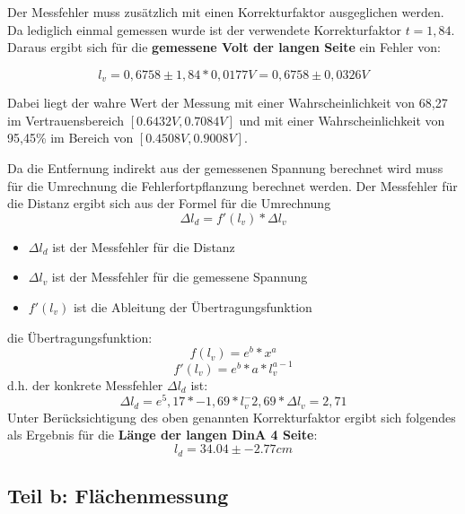 Der Messfehler muss zusätzlich mit einen Korrekturfaktor ausgeglichen werden.
Da lediglich einmal gemessen wurde ist der verwendete Korrekturfaktor $t = 1,84$.
Daraus ergibt sich für die \textbf{gemessene Volt der langen Seite} ein Fehler von:

\begin{equation}
	l_v = 0,6758 \pm 1,84 * 0,0177 V = 0,6758 \pm 0,0326 V
\end{equation}

Dabei liegt der wahre Wert der Messung mit einer Wahrscheinlichkeit von 68,27 im Vertrauensbereich $[0.6432V, 0.7084V]$ und mit einer Wahrscheinlichkeit von 95,45\% im Bereich von $[0.4508V, 0.9008V]$.

Da die Entfernung indirekt aus der gemessenen Spannung berechnet wird muss für die Umrechnung die Fehlerfortpflanzung berechnet werden.
Der Messfehler für die Distanz ergibt sich aus der Formel für die Umrechnung
\begin{equation}
	\Delta l_d = f'(l_v) * \Delta l_v
\end{equation}
\begin{itemize}
\item $\Delta l_d$ ist der Messfehler für die Distanz
\item $\Delta l_v$ ist der Messfehler für die gemessene Spannung
\item $f'(l_v)$ ist die Ableitung der Übertragungsfunktion
\end{itemize}

die Übertragungsfunktion:
\begin{equation}
	f(l_v) = e^b * x^a
\end{equation}
\begin{equation}
	f'(l_v) = e^b * a * l_v ^{a-1}
\end{equation}
d.h. der konkrete Messfehler $\Delta l_d$ ist:
\begin{equation}
	\Delta l_d = e^5,17 * -1,69 * l_v ^ -2,69 * \Delta l_v = 2,71
\end{equation}
Unter Berücksichtigung des oben genannten Korrekturfaktor ergibt sich folgendes als Ergebnis für die \textbf{Länge der langen DinA 4 Seite}:
\begin{equation}
	l_d = 34.04  ± -2.77 cm
\end{equation}


\subsection{Teil b: Flächenmessung}
\label{subS:Versuch3b}

